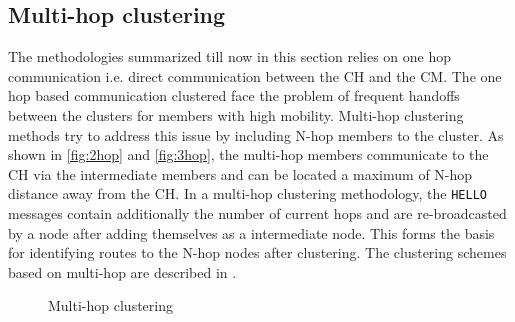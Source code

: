 \documentclass[]{ccs-thesis}
\begin{document}
\subsection{Multi-hop clustering}

The methodologies summarized till now in this section relies on one hop communication i.e. direct communication between
the \ac{CH} and the \ac{CM}. The one hop based communication clustered face the problem of frequent handoffs between
the clusters for members with high mobility. Multi-hop clustering methods try to address this issue by including N-hop
members to the cluster. As shown in \ref{fig:2hop} and \ref{fig:3hop}, the multi-hop members communicate to the \ac{CH}
via the intermediate members and can be located a maximum of N-hop distance away from the \ac{CH}. In a multi-hop
clustering methodology, the \texttt{HELLO} messages contain additionally the number of current hops and are re-broadcasted
by a node after adding themselves as a intermediate node. This forms the basis for identifying routes to the N-hop nodes
after clustering. The clustering schemes based on multi-hop are described in \cite{Zhang2069135, 6554933}.

\begin{figure}[h]%
	\centering
    \hfill%
    \hfill%
	\caption{Multi-hop clustering}%
	\label{fig:multihop}%
\end{figure}
\end{document}
